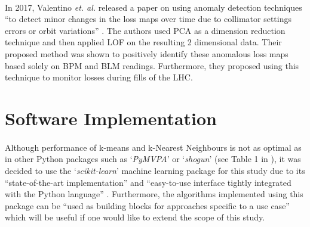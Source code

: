 \paragraph{ }In 2017, Valentino \textit{et. al.} released a paper on using anomaly detection techniques ``to detect minor changes in the loss maps over time due to collimator settings errors or orbit variations'' \cite{Valentino2017}. The authors used \acs{PCA} as a dimension reduction technique and then applied \acs{LOF} on the resulting 2 dimensional data. Their proposed method was shown to positively identify these anomalous loss maps based solely on \acs{BPM} and \acs{BLM} readings. Furthermore, they proposed using this technique to monitor losses during fills of the \acs{LHC}.

\section{Software Implementation}
\paragraph{ }Although performance of k-means and k-Nearest Neighbours is not as optimal as in other Python packages such as `\textit{PyMVPA}' \cite{PyMVPA} or `\textit{shogun}' \cite{Shogun} (see Table 1 in \cite{Pedregosa2011}), it was decided to use the `\textit{scikit-learn}' machine learning package for this study due to its ``state-of-the-art implementation'' and ``easy-to-use interface tightly integrated with the Python language'' \cite{Pedregosa2011}. Furthermore, the algorithms implemented using this package can be ``used as building blocks for approaches specific to a use case'' \cite{Pedregosa2011} which will be useful if one would like to extend the scope of this study.